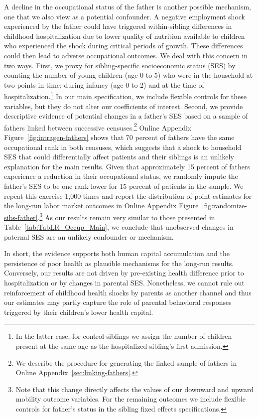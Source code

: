 \documentclass[12pt,english]{article}
\begin{document}
A decline in the occupational status of the father is another possible mechanism, one that we also view as a potential confounder. A negative employment shock experienced by the father could have triggered within-sibling differences in childhood hospitalization due to lower quality of nutrition available to children who experienced the shock during critical periods of growth. These differences could then lead to adverse occupational outcomes. We deal with this concern in two ways. First, we proxy for sibling-specific socioeconomic status (SES) by counting the number of young children (age 0 to 5) who were in the household at two points in time: during infancy (age 0 to 2) and at the time of hospitalization.\footnote{In the latter case, for control siblings we assign the number of children present at the same age as the hospitalized sibling's first admission.} In our main specification, we include flexible controls for these variables, but they do not alter our coefficients of interest. Second, we provide descriptive evidence of potential changes in a father's SES based on a sample of fathers linked between successive censuses.\footnote{We describe the procedure for generating the linked sample of fathers in Online Appendix~\ref{sec:linking-fathers}.} Online Appendix Figure~\ref{fig:intragen-fathers} shows that 70 percent of fathers have the same occupational rank in both censuses, which suggests that a shock to household SES that could differentially affect patients and their siblings is an unlikely explanation for the main results. Given that approximately 15 percent of fathers experience a reduction in their occupational status, we randomly impute the father's SES to be one rank lower for 15 percent of patients in the sample. We repeat this exercise 1,000 times and report the distribution of point estimates for the long-run labor market outcomes in Online Appendix Figure~\ref{fig:randomize-sibs-father}.\footnote{Note that this change directly affects the values of our downward and upward mobility outcome variables. For the remaining outcomes we include flexible controls for father's status in the sibling fixed effects specifications.} As our results remain very similar to those presented in Table~\ref{tab:TabLR_Occup_Main}, we conclude that unobserved changes in paternal SES are an unlikely confounder or mechanism.

In short, the evidence supports both human capital accumulation and the persistence of poor health as plausible mechanisms for the long-run results. Conversely, our results are not driven by pre-existing health difference prior to hospitalization or by changes in parental SES. Nonetheless, we cannot rule out reinforcement of childhood health shocks by parents as another channel and thus our estimates may partly capture the role of parental behavioral responses triggered by their children's lower health capital.
\end{document}
